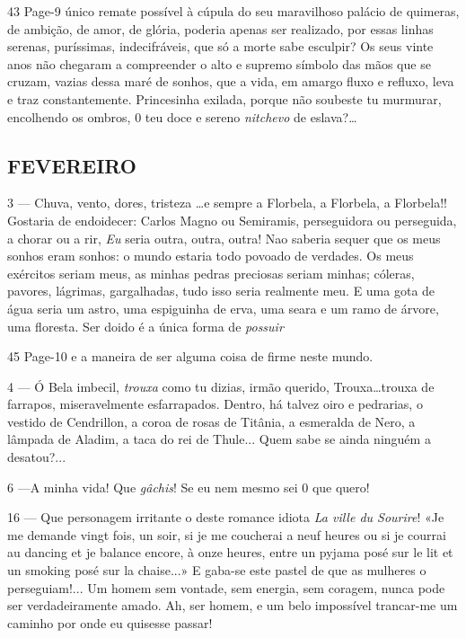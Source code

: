 43
Page-9
único remate possível à cúpula do seu maravilhoso
palácio de quimeras, de ambição, de amor, de glória,
poderia apenas ser realizado, por essas linhas serenas,
puríssimas, indecifráveis, que só a morte sabe 
esculpir? Os seus vinte anos não chegaram a compreender
o alto e supremo símbolo das mãos que se cruzam,
vazias dessa maré de sonhos, que a vida, em amargo
fluxo e refluxo, leva e traz constantemente. 
Princesinha exilada, porque não soubeste tu murmurar, 
encolhendo os ombros, 0 teu doce e sereno \textit{nitchevo}
de eslava?\ldots

\subsection{FEVEREIRO}

3 — Chuva, vento, dores, tristeza \ldots e sempre a 
Florbela, a Florbela, a Florbela!! Gostaria de endoidecer:
Carlos Magno ou Semiramis, perseguidora ou 
perseguida, a chorar ou a rir, \textit{Eu} seria outra, outra, outra!
Nao saberia sequer que os meus sonhos eram sonhos:
o mundo estaria todo povoado de verdades. Os meus
exércitos seriam meus, as minhas pedras preciosas seriam
minhas; cóleras, pavores, lágrimas, gargalhadas, tudo isso
seria realmente meu. E uma gota de água seria um astro,
uma espiguinha de erva, uma seara e um ramo de 
árvore, uma floresta. Ser doido é a única forma de \textit{possuir}

45
Page-10
e a maneira de ser alguma coisa de firme neste
mundo.

4 — Ó Bela imbecil, \textit{trouxa} como tu dizias, irmão
querido, Trouxa\ldots trouxa de farrapos, miseravelmente
esfarrapados. Dentro, há talvez oiro e pedrarias, o
vestido de Cendrillon, a coroa de rosas de Titânia,
a esmeralda de Nero, a lâmpada de Aladim, a taca
do rei de Thule... Quem sabe se ainda ninguém a
desatou?...

6 —A minha vida! Que \textit{gâchis}! Se eu nem mesmo sei
0 que quero!

16 — Que personagem irritante o deste romance idiota
\textit{La ville du Sourire}! «Je me demande vingt fois,
un soir, si je me coucherai a neuf heures ou si je courrai
au dancing et je balance encore, à onze heures, entre
un pyjama posé sur le lit et un smoking posé sur la
chaise...» E gaba-se este pastel de que as mulheres o
perseguiam!... Um homem sem vontade, sem energia,
sem coragem, nunca pode ser verdadeiramente amado.
Ah, ser homem, e um belo impossível trancar-me um
caminho por onde eu quisesse passar!

